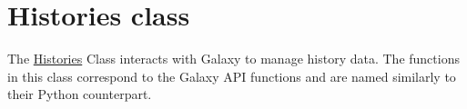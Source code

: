 \hypertarget{group__histories__class}{}\section{Histories class}
\label{group__histories__class}
The \hyperlink{classHistories}{Histories} Class interacts with Galaxy to manage history data. The functions in this class correspond to the Galaxy A\+PI functions and are named similarly to their Python counterpart. 